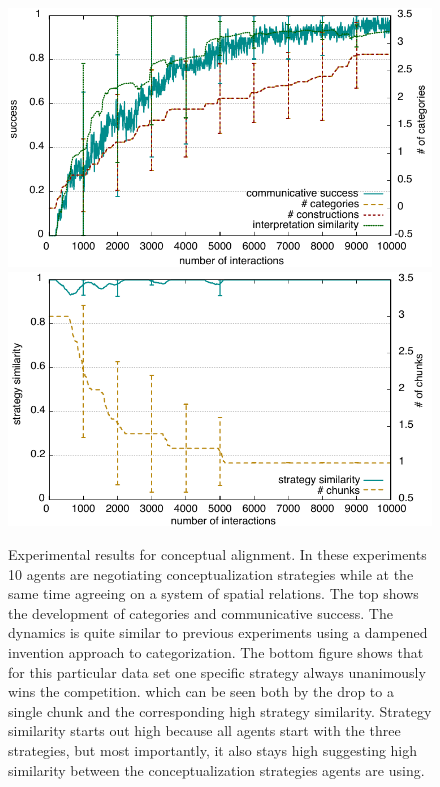 \begin{figure}
\begin{centering}
\includegraphics[width=0.85\columnwidth]{figs/chunk-alignment-formation-projective-space-game-5-success}
\includegraphics[width=0.85\columnwidth]{figs/chunk-alignment-formation-projective-space-game-5-alignment}
\caption[Results for conceptual alignment]{Experimental results for conceptual alignment. In these experiments 10 agents
are negotiating conceptualization strategies while at the same time agreeing on a system of 
spatial relations. The top shows the development of categories and communicative success. 
The dynamics is quite similar to previous experiments using a dampened invention 
approach to categorization. The bottom figure shows that for this particular data set one 
specific strategy always unanimously wins the competition. which can be seen both by the 
drop to a single chunk and the corresponding high strategy similarity. Strategy 
similarity starts out high because all agents start 
with the three strategies, but most importantly, it also stays high suggesting high similarity between
the conceptualization strategies agents are using.
}
\label{f:chunk-alignment-formation}
\end{centering}
\end{figure}

